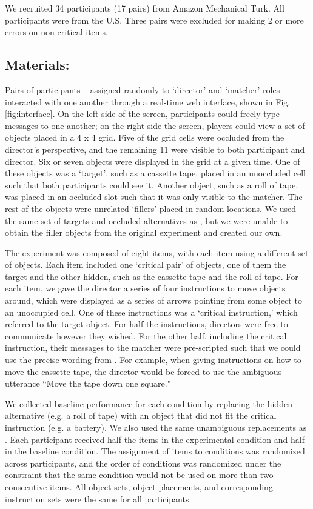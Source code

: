 \documentclass[10pt,letterpaper]{article}
\begin{document}
We recruited 34 participants (17 pairs) from Amazon Mechanical Turk. All participants were from the U.S. Three pairs were excluded for making 2 or more errors on non-critical items.

\subsection{Materials:}

Pairs of participants -- assigned randomly to `director' and `matcher' roles -- interacted with one another through a real-time web interface, shown in Fig. \ref{fig:interface}. On the left side of the screen, participants could freely type messages to one another; on the right side the screen, players could view a set of objects placed in a 4 x 4 grid. Five of the grid cells were occluded from the director's perspective, and the remaining 11 were visible to both participant and director. Six or seven objects were displayed in the grid at a given time. One of these objects was a `target', such as a cassette tape, placed in an unoccluded cell such that both participants could see it. Another object, such as a roll of tape, was placed in an occluded slot such that it was only visible to the matcher. The rest of the objects were unrelated `fillers' placed in random locations. We used the same set of targets and occluded alternatives as , but we were unable to obtain the filler objects from the original experiment and created our own.

The experiment was composed of eight items, with each item using a different set of objects. Each item included one `critical pair' of objects, one of them the target and the other hidden, such as the cassette tape and the roll of tape. For each item, we gave the director a series of four instructions to move objects around, which were displayed as a series of arrows pointing from some object to an unoccupied cell. One of these instructions was a `critical instruction,' which referred to the target object. For half the instructions, directors were free to communicate however they wished. For the other half, including the critical instruction, their messages to the matcher were pre-scripted such that we could use the precise wording from . For example, when giving instructions on how to move the cassette tape, the director would be forced to use the ambiguous utterance ``Move the tape down one square." 

We collected baseline performance for each condition by replacing the hidden alternative (e.g. a roll of tape) with an object that did not fit the critical instruction (e.g. a battery). We also used the same unambiguous replacements as . Each participant received half the items in the experimental condition and half in the baseline condition. The assignment of items to conditions was randomized across participants, and the order of conditions was randomized under the constraint that the same condition would not be used on more than two consecutive items. All object sets, object placements, and corresponding instruction sets were the same for all participants.
\end{document}
